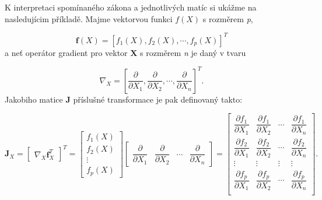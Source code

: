 \documentclass[11pt,a4paper]{article}
\begin{document}
K interpretaci spomínaného zákona a jednotlivých matíc si ukážme na nasledujícim příkladě. Majme vektorvou funkci $f\left(X\right)$ s rozměrem \textit{p}, 

\begin{equation}
\mathbf{f}\left(X\right) = \left[f_{1}\left(X\right),f_{2}\left(X\right),\cdots , f_{p}\left(X\right) \right]^{T}
\end{equation}
a neť operátor gradient pro vektor $\mathbf{X}$ s rozměrem \textit{n} je daný v tvaru

\begin{equation}
\nabla_{X} = \left[\dfrac{\partial}{\partial X_{1}}, \dfrac{\partial}{\partial X_{2}}, \cdots, \dfrac{\partial}{\partial X_{n}}\right]^{T}.
\end{equation}
Jakobiho matice \textbf{J} příslušné transformace je pak definovaný takto:

\begin{equation}
\mathbf{J}_{X} = 
\begin{bmatrix}
\nabla_{X}\mathbf{f}_{X}^{T}
\end{bmatrix}^{T} = 
\begin{bmatrix}
f_{1}\left(X\right) \\
f_{2}\left(X\right) \\
\vdots \\
f_{p}\left(X\right)
\end{bmatrix} 
\begin{bmatrix}
\dfrac{\partial}{\partial X_{1}} & \dfrac{\partial}{\partial X_{2}} & \cdots &\dfrac{\partial}{\partial X_{n}}
\end{bmatrix} =
\begin{bmatrix}
\dfrac{\partial f_{1}}{\partial X_{1}} & \dfrac{\partial f_{1}}{\partial X_{2}} & \cdots & \dfrac{\partial f_{1}}{\partial X_{n}} \\
\dfrac{\partial f_{2}}{\partial X_{1}} & \dfrac{\partial f_{2}}{\partial X_{2}} & \cdots & \dfrac{\partial f_{2}}{\partial X_{n}} \\
\vdots & \vdots & \vdots & \vdots \\
\dfrac{\partial f_{p}}{\partial X_{1}} & \dfrac{\partial f_{p}}{\partial X_{2}} & \cdots & \dfrac{\partial f_{p}}{\partial X_{n}} \\
\end{bmatrix}.
\end{equation}
\end{document}
